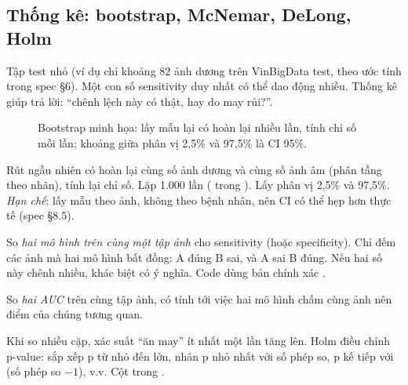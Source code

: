 \subsection{Thống kê: bootstrap, McNemar, DeLong, Holm}
\label{sec:stats}

Tập test nhỏ (ví dụ chỉ khoảng 82 ảnh dương trên VinBigData test, theo ước tính trong spec §6). Một con số sensitivity duy nhất có thể dao động nhiều.
Thống kê giúp trả lời: ``chênh lệch này có thật, hay do may rủi?''.

\begin{figure}[H]
\centering
{}
\caption{Bootstrap minh họa: lấy mẫu lại có hoàn lại nhiều lần, tính chỉ số mỗi lần; khoảng giữa phân vị 2,5\% và 97,5\% là CI 95\%.}
\label{fig:bootstrap}
\end{figure}

\begin{description}[leftmargin=1.2em,style=nextline]
\item[Bootstrap CI \en{khoảng tin cậy bootstrap}] Rút ngẫu nhiên có hoàn lại cùng số ảnh dương và cùng số ảnh âm (phân tầng theo nhãn), tính lại chỉ số.
  Lặp 1.000 lần ( trong ). Lấy phân vị 2,5\% và 97,5\%.
  \emph{Hạn chế}: lấy mẫu theo ảnh, không theo bệnh nhân, nên CI có thể hẹp hơn thực tế (spec §8.5).
\item[McNemar] So \emph{hai mô hình trên cùng một tập ảnh} cho sensitivity (hoặc specificity). Chỉ đếm các ảnh mà hai mô hình bất đồng:
  A đúng B sai, và A sai B đúng. Nếu hai số này chênh nhiều, khác biệt có ý nghĩa. Code dùng bản chính xác .
\item[DeLong] So \emph{hai AUC} trên cùng tập ảnh, có tính tới việc hai mô hình chấm cùng ảnh nên điểm của chúng tương quan.
\item[Holm] Khi so nhiều cặp, xác suất ``ăn may'' ít nhất một lần tăng lên. Holm điều chỉnh p-value: sắp xếp p từ nhỏ đến lớn,
  nhân p nhỏ nhất với số phép so, p kế tiếp với (số phép so $-1$), v.v. Cột  trong .
\end{description}

